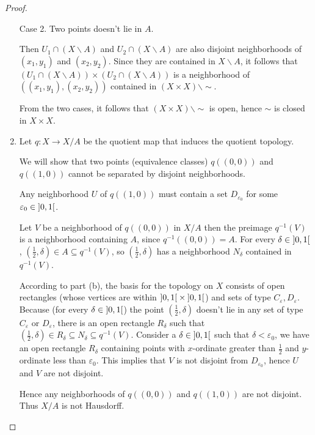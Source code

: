 \begin{proof}
\begin{enumerate}[label={(\alph*)}]
              Case 2. Two points doesn't lie in $A$.

              Then $U_{1}\cap (X\smallsetminus A)$ and $U_{2} \cap (X\smallsetminus A)$ are also disjoint neighborhoods of $(x_{1}, y_{1})$ and $(x_{2}, y_{2})$. Since they are contained in $X\smallsetminus A$, it follows that $(U_{1}\cap (X\smallsetminus A)) \times (U_{2}\cap (X\smallsetminus A))$ is a neighborhood of $\left((x_{1}, y_{1}), (x_{2}, y_{2})\right)$ contained in $(X\times X)\smallsetminus\sim$.

              From the two cases, it follows that $(X\times X)\smallsetminus\sim$ is open, hence $\sim$ is closed in $X\times X$.
        \item Let $q: X \to X/A$ be the quotient map that induces the quotient topology.

              We will show that two points (equivalence classes) $q((0, 0))$ and $q((1, 0))$ cannot be separated by disjoint neighborhoods.

              Any neighborhood $U$ of $q((1, 0))$ must contain a set $D_{\varepsilon_{0}}$ for some $\varepsilon_{0} \in \left]{0,1}\right[$.

              Let $V$ be a neighborhood of $q((0, 0))$ in $X/A$ then the preimage $q^{-1}(V)$ is a neighborhood containing $A$, since $q^{-1}((0, 0)) = A$. For every $\delta \in \left]{0,1}\right[$, $\left(\frac{1}{2}, \delta\right) \in A \subseteq q^{-1}(V)$, so $\left(\frac{1}{2}, \delta\right)$ has a neighborhood $N_{\delta}$ contained in $q^{-1}(V)$.

              According to part (b), the basis for the topology on $X$ consists of open rectangles (whose vertices are within $\left]{0,1}\right[\times\left]{0,1}\right[$) and sets of type $C_{\varepsilon}, D_{\varepsilon}$. Because (for every $\delta \in \left]{0,1}\right[$) the point $\left(\frac{1}{2}, \delta\right)$ doesn't lie in any set of type $C_{\varepsilon}$ or $D_{\varepsilon}$, there is an open rectangle $R_{\delta}$ such that $\left(\frac{1}{2}, \delta\right) \in R_{\delta} \subseteq N_{\delta} \subseteq q^{-1}(V)$. Consider a $\delta \in \left]{0, 1}\right[$ such that $\delta < \varepsilon_{0}$, we have an open rectangle $R_{\delta}$ containing points with $x$-ordinate greater than $\frac{1}{2}$ and $y$-ordinate less than $\varepsilon_{0}$. This implies that $V$ is not disjoint from $D_{\varepsilon_{0}}$, hence $U$ and $V$ are not disjoint.

              Hence any neighborhoods of $q((0, 0))$ and $q((1, 0))$ are not disjoint. Thus $X/A$ is not Hausdorff.
    \end{enumerate}
\end{proof}

